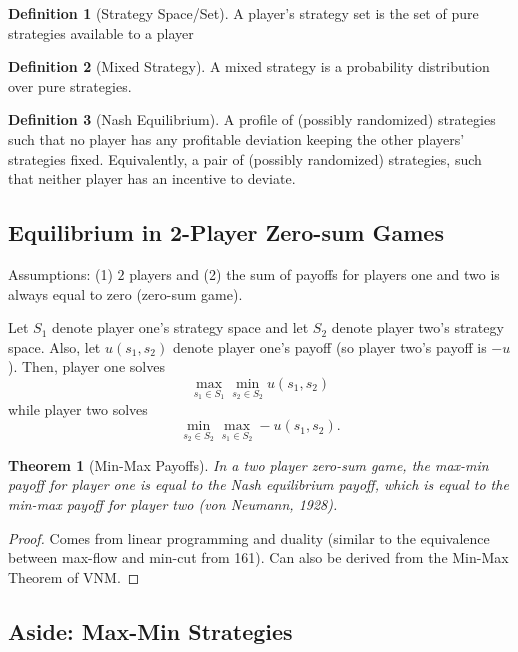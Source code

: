 \documentclass[dvipsnames]{article}
\newtheorem{theorem}{Theorem}[section]
\theoremstyle{definition}
\newtheorem{definition}{Definition}[section]
\theoremstyle{remark}
\begin{document}
\begin{definition}[Strategy Space/Set]
	A player's strategy set is the set of pure strategies available to a player
\end{definition}
	
\begin{definition}[Mixed Strategy]
	A mixed strategy is a probability distribution over pure strategies. 
\end{definition}

\begin{definition}[Nash Equilibrium]
	A profile of (possibly randomized) strategies such that no player has any profitable deviation keeping the other players' strategies fixed.
	Equivalently, a pair of (possibly randomized) strategies, such that neither player has an incentive to deviate.
\end{definition}

\subsection{Equilibrium in 2-Player Zero-sum Games}

Assumptions: (1) $2$ players and (2) the sum of payoffs for players one and two is always equal to zero (zero-sum game).

Let $S_1$ denote player one's strategy space and let $S_2$ denote player two's strategy space. Also, let $u(s_1,s_2)$ denote player one's payoff (so player two's payoff is $-u$). Then, player one solves
$$\max_{s_1 \in S_1} \min_{s_2 \in S_2} u(s_1,s_2)$$
while player two solves
$$\min_{s_2 \in S_2} \max_{s_1 \in S_2} -u(s_1,s_2).$$

\begin{theorem}[Min-Max Payoffs]
	In a two player zero-sum game, the max-min payoff for player one is equal to the Nash equilibrium payoff, which is equal to the min-max payoff for player two (von Neumann, 1928).
\end{theorem}

\begin{proof}
	Comes from linear programming and duality (similar to the equivalence between max-flow and min-cut from 161). Can also be derived from the Min-Max Theorem of VNM.
\end{proof}

\subsection{Aside: Max-Min Strategies}
\end{document}
